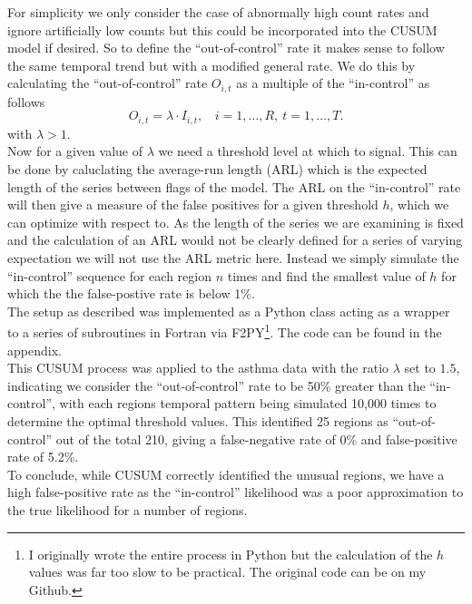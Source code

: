 \documentclass{report}
\begin{document}
For simplicity we only consider the case of abnormally high count rates and ignore artificially low counts but this could be incorporated into the CUSUM model if desired. So to define the ``out-of-control'' rate it makes sense to follow the same temporal trend but with a modified general rate. We do this by calculating the ``out-of-control'' rate $O_{i,t}$ as a multiple of the ``in-control'' as follows
\begin{equation}
O_{i,t} = \lambda \cdot I_{i,t}, \ \ \ \  i = 1, \ldots, R, \ t = 1, \ldots, T.
\end{equation} 
with $\lambda > 1$. \\

Now for a given value of $\lambda$ we need a threshold level at which to signal. This can be done by caluclating the average-run length (ARL) which is the expected length of the series between flags of the model. The ARL on the ``in-control'' rate will then give a measure of the false positives for a given threshold $h$, which we can optimize with respect to. As the length of the series we are examining is fixed and the calculation of an ARL would not be clearly defined for a series of varying expectation we will not use the ARL metric here. Instead we simply simulate the ``in-control'' sequence for each region $n$ times and find the smallest value of $h$ for which the the false-postive rate is below 1\%. \\

The setup as described was implemented as a Python class acting as a wrapper to a series of subroutines in Fortran via F2PY\footnote{I originally wrote the entire process in Python but the calculation of the $h$ values was far too slow to be practical. The original code can be on my Github.}. The code can be found in the appendix. \\

This CUSUM process was applied to the asthma data with the ratio $\lambda$ set to $1.5$, indicating we consider the ``out-of-control'' rate to be 50\% greater than the ``in-control'', with each regions temporal pattern being simulated 10,000 times to determine the optimal threshold values. This identified 25 regions as ``out-of-control'' out of the total 210, giving a false-negative rate of 0\% and false-positive rate of 5.2\%. \\

To conclude, while CUSUM correctly identified the unusual regions, we have a high false-positive rate as the ``in-control'' likelihood was a poor approximation to the true likelihood for a number of regions.  
\end{document}
